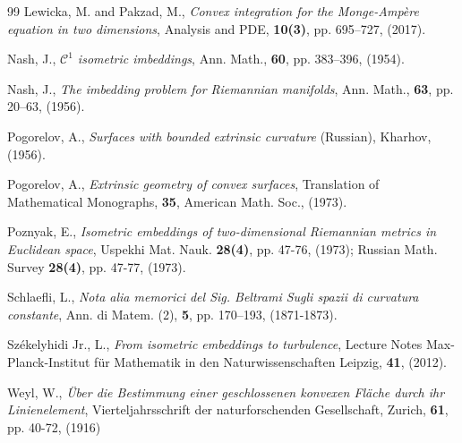 \documentclass[reqno,twoside,11pt]{amsart}
\numberwithin{equation}{section}
\theoremstyle{plain}
\theoremstyle{definition}
\begin{document}
\begin{thebibliography}{99}
 {\sc Lewicka, M.  and Pakzad, M.},
{\em Convex integration for the Monge-Amp\`ere equation in two
  dimensions}, Analysis and PDE, {\bf 10(3)}, pp. 695--727, (2017).

 {\sc Nash, J.}, {\em $\mathcal{C}^1$ isometric
    imbeddings}, Ann. Math., {\bf 60}, pp. 383--396, (1954).

 {\sc Nash, J.}, {\em The imbedding problem for Riemannian
    manifolds}, Ann. Math., {\bf 63}, pp. 20--63, (1956).

 {\sc Pogorelov, A.}, {\em Surfaces with bounded extrinsic curvature} (Russian),
Kharhov, (1956).

 {\sc Pogorelov, A.}, {\em Extrinsic geometry of convex surfaces}, Translation of
Mathematical Monographs, {\bf 35}, American Math. Soc., (1973).

 {\sc Poznyak, E.}, {\em Isometric embeddings of
    two-dimensional Riemannian metrics in Euclidean space}, Uspekhi
  Mat. Nauk. {\bf 28(4)}, pp. 47-76, (1973); 
Russian Math. Survey {\bf 28(4)}, pp. 47-77, (1973).

 {\sc Schlaefli, L.}, {\em Nota alia memorici del Sig. Beltrami Sugli spazii di curvatura
constante}, Ann. di Matem. (2),  {\bf 5}, pp. 170--193, (1871-1873).

 {\sc Sz\'ekelyhidi Jr., L.}, {\em From isometric
    embeddings to turbulence}, Lecture Notes Max-Planck-Institut f\"ur Mathematik
in den Naturwissenschaften Leipzig, {\bf{41}}, (2012).

 {\sc Weyl, W.}, {\em \"Uber die Bestimmung einer
    geschlossenen konvexen 
Fl\"ache durch ihr Linienelement}, Vierteljahrsschrift der
naturforschenden Gesellschaft, Zurich, {\bf 61}, pp. 40-72, (1916)

\end{thebibliography}
\end{document}
